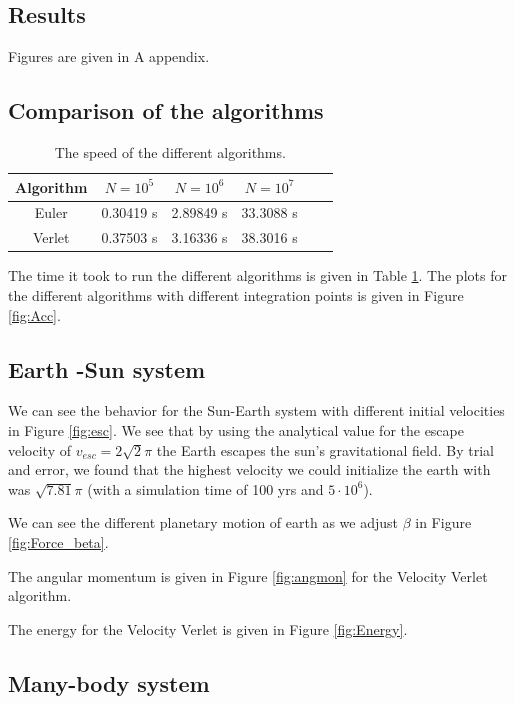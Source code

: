 \documentclass{article}
\begin{document}
\begin{multicols}{2}
\section{Results}

Figures are given in A appendix. 

\subsection{Comparison of the algorithms}

\begin{table}[H]
\begin{center}
\caption{The speed of the different algorithms.}
\begin{tabular}{  |c|c|c|c|c|c| } \hline
Algorithm&$N=10^5$&$N=10^6$&$N=10^7$ \\ \hline
Euler&0.30419 s&2.89849 s&33.3088 s\\ \hline
Verlet&0.37503 s&3.16336 s &38.3016 s \\ \hline
\end{tabular}
\label{tab:Algo_N}
\end{center}
\end{table}

The time it took to run the different algorithms is given in Table \ref{tab:Algo_N}. The plots for the different algorithms with different integration points is given in Figure \ref{fig:Acc}.

\subsection{Earth -Sun system}

We can see the behavior for the Sun-Earth system with different initial velocities in Figure \ref{fig:esc}. We see that by using the analytical value for the escape velocity of $v_{esc}=2 \sqrt{2} \pi $ the Earth escapes the sun's gravitational field. By trial and error, we found that the highest velocity we could initialize the earth with was $\sqrt{7.81} \pi$ (with a simulation time of 100 yrs and $5\cdot 10^6$). 

We can see the different planetary motion of earth as we adjust $\beta$ in Figure \ref{fig:Force_beta}.

The angular momentum is given in Figure \ref{fig:angmon} for the Velocity Verlet algorithm. 

The energy for the Velocity Verlet is given in Figure \ref{fig:Energy}.

\subsection{Many-body system}


\end{multicols}
\end{document}
